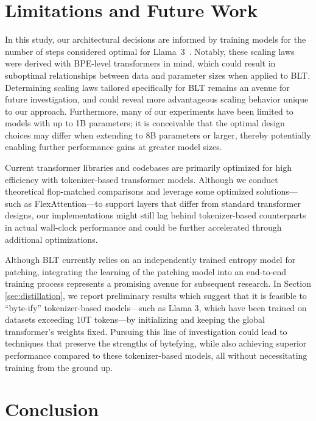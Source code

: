 \section{Limitations and Future Work}

In this study, our architectural decisions are informed by training models for the number of steps considered optimal for Llama~3~\citep{dubey2024llama}. Notably, these scaling laws were derived with BPE-level transformers in mind, which could result in suboptimal relationships between data and parameter sizes when applied to {\textsc BLT}. Determining scaling laws tailored specifically for {\textsc BLT} remains an avenue for future investigation, and could reveal more advantageous scaling behavior unique to our approach. Furthermore, many of our experiments have been limited to models with up to 1B parameters; it is conceivable that the optimal design choices may differ when extending to 8B parameters or larger, thereby potentially enabling further performance gains at greater model sizes.

Current transformer libraries and codebases are primarily optimized for high efficiency with tokenizer-based transformer models. Although we conduct theoretical flop-matched comparisons and leverage some optimized solutions—such as FlexAttention—to support layers that differ from standard transformer designs, our implementations might still lag behind tokenizer-based counterparts in actual wall-clock performance and could be further accelerated through additional optimizations.

Although {\textsc BLT} currently relies on an independently trained entropy model for patching, integrating the learning of the patching model into an end-to-end training process represents a promising avenue for subsequent research. In Section \ref{sec:distillation}, we report preliminary results which suggest that it is feasible to “byte-ify” tokenizer-based models—such as Llama 3, which have been trained on datasets exceeding 10T tokens—by initializing and keeping the global transformer's weights fixed. Pursuing this line of investigation could lead to techniques that preserve the strengths of bytefying, while also achieving superior performance compared to these tokenizer-based models, all without necessitating training from the ground up.

\section{Conclusion}
\label{section:conclusion}

